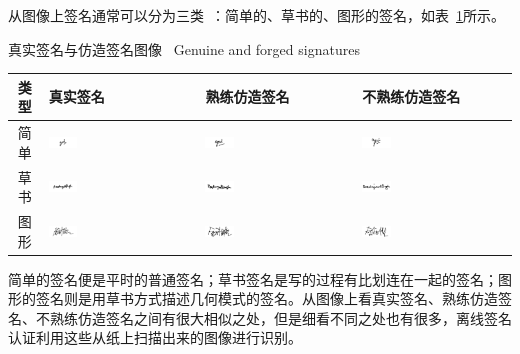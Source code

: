从图像上签名通常可以分为三类~\cite{Hanmandlu2005Off}：简单的、草书的、图形的签名，如表~\ref{tab:signatures-images}所示。
\begin{table}[!hpb]
  \centering
  \bicaption
    {真实签名与仿造签名图像~\cite{Hanmandlu2005Off}}
    {Genuine and forged signatures}
  \label{tab:signatures-images}
  \begin{tabular}{|c|m{}|m{}|m{}|} \toprule 
    类型 & 真实签名 & 熟练仿造签名 & 不熟练仿造签名\\ \midrule
   简单& \includegraphics[width=0.2\textwidth]{figure/signature-1.png}&\includegraphics[width=0.2\textwidth]{figure/signature-2.png}&\includegraphics[width=0.2\textwidth]{figure/signature-3.png} \\ \midrule
    草书&\includegraphics[width=0.2\textwidth]{figure/signature-4.png}&\includegraphics[width=0.2\textwidth]{figure/signature-5.png}&\includegraphics[width=0.2\textwidth]{figure/signature-6.png} \\ \midrule
    图形&\includegraphics[width=0.2\textwidth]{figure/signature-7.png}&\includegraphics[width=0.2\textwidth]{figure/signature-8.png}&\includegraphics[width=0.2\textwidth]{figure/signature-9.png} \\ 
        \bottomrule
  \end{tabular}
\end{table}
简单的签名便是平时的普通签名；草书签名是写的过程有比划连在一起的签名；图形的签名则是用草书方式描述几何模式的签名。从图像上看真实签名、熟练仿造签名、不熟练仿造签名之间有很大相似之处，但是细看不同之处也有很多，离线签名认证利用这些从纸上扫描出来的图像进行识别。

